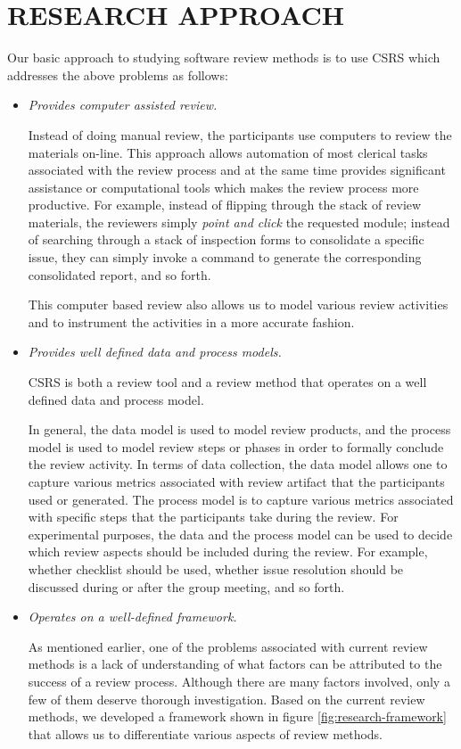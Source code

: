 \section {RESEARCH APPROACH}
Our basic approach to studying software review methods is to use CSRS 
which addresses the above problems as follows:
\begin {itemize}
\item {\sl Provides computer assisted review.}

Instead of doing manual review, the participants use computers to
review the materials on-line. This approach allows automation of most
clerical tasks associated with the review process and at the same time
provides significant assistance or computational tools which makes the
review process more productive. For example, instead of flipping
through the stack of review materials, the reviewers simply {\it point
and click} the requested module; instead of searching through a stack
of inspection forms to consolidate a specific issue, they can simply
invoke a command to generate the corresponding consolidated report,
and so forth.

This computer based review also allows us to model various review
activities and to instrument the activities in a more accurate
fashion.

\item {\sl Provides well defined data and process models.}

CSRS is both a review tool and a review method that operates on a well
defined data and process model.

In general, the data model is used to model review products, and the
process model is used to model review steps or phases in order to
formally conclude the review activity.  In terms of data collection,
the data model allows one to capture various metrics associated with
review artifact that the participants used or generated. The process
model is to capture various metrics associated with specific steps
that the participants take during the review.  For experimental
purposes, the data and the process model can be used to decide which
review aspects should be included during the review.  For example,
whether checklist should be used, whether issue resolution should be
discussed during or after the group meeting, and so forth.

\item {\sl Operates on a well-defined framework.}

As mentioned earlier, one of the problems associated with current
review methods is a lack of understanding of what factors can
be attributed to the success of a review process. Although there are
many factors involved, only a few of them deserve thorough
investigation. Based on the current review methods, we developed a
framework shown in figure \ref{fig:research-framework} that allows us
to differentiate various aspects of review methods. 



\end{itemize}
